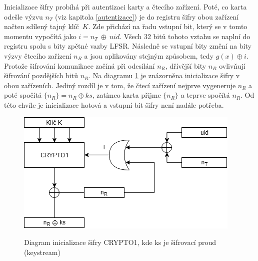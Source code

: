 \par
Inicializace šifry probíhá při autentizaci karty a čtecího zařízení. Poté, co karta odešle výzvu $n_T$ (viz kapitola \ref{autentizace}) je do registru šifry obou zařízení načten sdílený tajný klíč~$K$. Zde přichází na řadu vstupní bit, který se v tomto momentu vypočítá jako $i = n_T~\oplus~{uid}$. Všech 32 bitů tohoto vztahu se naplní do registru spolu s bity zpětné vazby LFSR. Následně se vstupní bity změní na bity výzvy čtecího zařízení $n_R$ a jsou aplikovány stejným způsobem, tedy $g(x) \oplus i$. Protože šifrování komunikace začíná při odesílání $n_R$, dřívější bity $n_R$ ovlivňují šifrování pozdějších bitů $n_R$. Na diagramu \ref{obrazekInicializaceSifry} je znázorněna inicializace šifry v obou zařízeních. Jediný rozdíl je v tom, že čtecí zařízení nejprve vygeneruje $n_R$ a poté spočítá ${\{n_R\} = n_R \oplus ks}$, zatímco karta přijme $\{n_R\}$ a teprve spočítá $n_R$. Od této chvíle je inicializace hotová a vstupní bit šifry není nadále potřeba\cite{Dismantling_Mifare_Classic}.

\begin{figure}[ht]\centering
  \centering
  \includegraphics[width=0.7\linewidth]{obrazky-figures/cryptoInitialization.png}\\[1pt]  
  \caption{Diagram inicializace šifry CRYPTO1, kde ks je šifrovací proud (keystream)\cite{Dismantling_Mifare_Classic}}    
  \label{obrazekInicializaceSifry}
\end{figure}

